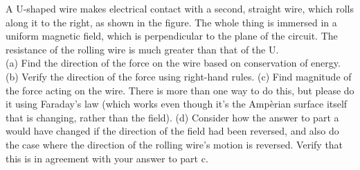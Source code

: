 A U-shaped wire makes electrical contact with a second, straight wire, which rolls along it to the
right,
as shown in the figure. The whole thing is immersed in a uniform magnetic field, which is
perpendicular to the plane of the circuit. The resistance of the rolling wire is much
greater than that of the U.\\
(a) Find the direction of the force on the wire based on conservation of energy.\hwendpart
(b) Verify the direction of the force using right-hand rules.\hwendpart
(c) Find magnitude of the force acting on the wire.
 There is more than one way to do this, but please
do it using Faraday's law (which works even though it's the
Amp\`{e}rian surface itself that is changing, rather than the field).\answercheck\hwendpart
(d) Consider how the answer to part a would have changed if the direction of the field had been
reversed, and also do the case where the direction of the rolling wire's motion is reversed.
Verify that this is in agreement with your answer to part c.
